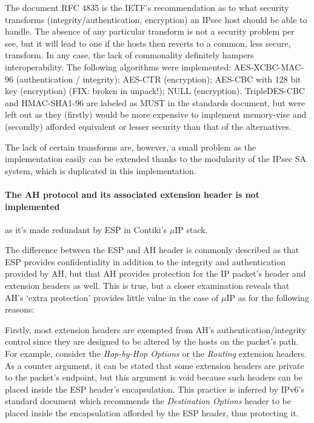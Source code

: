 \documentclass[final,a4paper,twoside,11pt,onecolumn]{report}
\begin{document}
The document RFC 4835 is the IETF's recommendation as to what security transforms (integrity/authentication, encryption) an IPsec host should be able to handle. The absence of any particular transform is not a security problem per see, but it will lead to one if the hosts then reverts to a common, less secure, transform. In any case, the lack of commonality definitely hampers interoperability. The following algorithms were implemented: AES-XCBC-MAC-96\cite{rfc3566} (authentication / integrity); AES-CTR\cite{rfc3686} (encryption); AES-CBC with 128 bit key\cite{rfc3602} (encryption) (FIX: broken in unpack!); NULL\cite{rfc2410} (encryption). TripleDES-CBC\cite{rfc2451} and HMAC-SHA1-96\cite{rfc2404} are labeled as MUST in the standards document\cite{rfc4835}, but were left out as they (firstly) would be more expensive to implement memory-vise and (secondly) afforded equivalent or lesser security than that of the alternatives.

The lack of certain transforms are, however, a small problem as the implementation easily can be extended thanks to the modularity of the IPsec SA system, which is duplicated in this implementation.

\paragraph{The AH protocol and its associated extension header is not implemented} as it's made redundant by ESP in Contiki's $\mu$IP stack.

The difference between the ESP and AH header is commonly described as that ESP provides confidentiality in addition to the integrity and authentication provided by AH, but that AH provides protection for the IP packet's header and extension headers as well. This is true, but a closer examination reveals that AH's `extra protection' provides little value in the case of $\mu$IP as for the following reasons:

Firstly, most extension headers are exempted from AH's authentication/integrity control since they are designed to be altered by the hosts on the packet's path. For example, consider the \emph{Hop-by-Hop Options} or the \emph{Routing} extension headers. As a counter argument, it can be stated that some extension headers are private to the packet's endpoint, but this argument is void because such headers can be placed inside the ESP header's encapsulation. This practice is inferred by IPv6's standard document\citep[p.13]{rfc2460} which recommends the \emph{Destination Options} header to be placed inside the encapsulation afforded by the ESP header, thus protecting it.
\end{document}
